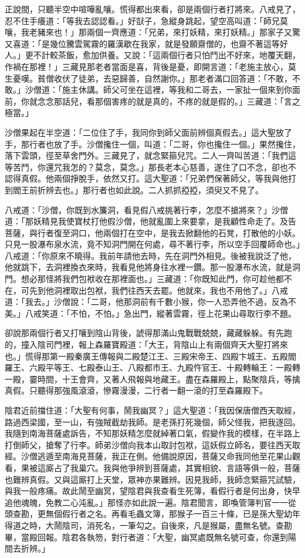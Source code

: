 正說間，只聽半空中喧嘩亂嚷。慌得都出來看，卻是兩個行者打將來。八戒見了，忍不住手癢道：「等我去認認看。」好獃子，急縱身跳起，望空高叫道：「師兄莫嚷，我老豬來也！」那兩個一齊應道：「兄弟，來打妖精，來打妖精。」那家子又驚又喜道：「是幾位騰雲駕霧的羅漢歇在我家，就是發願齋僧的，也齋不著這等好人。」更不計較茶飯，愈加供養。又說：「這兩個行者只怕鬥出不好來，地覆天翻，作禍在那裡！」三藏見那老者當面是喜，背後是憂，即開言道：「老施主放心，莫生憂嘆。貧僧收伏了徒弟，去惡歸善，自然謝你。」那老者滿口回答道：「不敢，不敢。」沙僧道：「施主休講。師父可坐在這裡，等我和二哥去，一家扯一個來到你面前，你就念念那話兒，看那個害疼的就是真的，不疼的就是假的。」三藏道：「言之極當。」

沙僧果起在半空道：「二位住了手，我同你到師父面前辨個真假去。」這大聖放了手，那行者也放了手。沙僧攙住一個，叫道：「二哥，你也攙住一個。」果然攙住，落下雲頭，徑至草舍門外。三藏見了，就念緊箍兒咒。二人一齊叫苦道：「我們這等苦鬥，你還咒我怎的？莫念，莫念。」那長老本心慈善，遂住了口不念，卻也不認得真假。他兩個掙脫手，依然又打。這大聖道：「兄弟們保著師父，等我與他打到閻王前折辨去也。」那行者也如此說。二人抓抓掗掗，須臾又不見了。

八戒道：「沙僧，你既到水簾洞，看見假八戒挑著行李，怎麼不搶將來？」沙僧道：「那妖精見我使寶杖打他假沙僧，他就亂圍上來要拿，是我顧性命走了。及告菩薩，與行者復至洞口，他兩個打在空中，是我去掀翻他的石凳，打散他的小妖。只見一股瀑布泉水流，竟不知洞門開在何處，尋不著行李，所以空手回覆師命也。」八戒道：「你原來不曉得。我前年請他去時，先在洞門外相見。後被我說泛了他，他就跳下，去洞裡換衣來時，我看見他將身往水裡一鑽。那一股瀑布水流，就是洞門。想必那怪將我們包袱收在那裡面也。」三藏道：「你既知此門，你可趁他都不在，可先到他洞裡取出包袱，我們往西天去罷。他就來，我也不用他了。」八戒道：「我去。」沙僧說：「二哥，他那洞前有千數小猴，你一人恐弄他不過，反為不美。」八戒笑道：「不怕，不怕。」急出門，縱著雲霧，徑上花果山尋取行李不題。

卻說那兩個行者又打嚷到陰山背後，諕得那滿山鬼戰戰兢兢，藏藏躲躲。有先跑的，撞入陰司門裡，報上森羅寶殿道：「大王，背陰山上有兩個齊天大聖打將來也。」慌得那第一殿秦廣王傳報與二殿楚江王、三殿宋帝王、四殿卞城王、五殿閻羅王、六殿平等王、七殿泰山王、八殿都市王、九殿忤官王、十殿轉輪王：一殿轉一殿，霎時間，十王會齊，又著人飛報與地藏王。盡在森羅殿上，點聚陰兵，等擒真假。只聽得那強風滾滾，慘霧漫漫，二行者一翻一滾的打至森羅殿下。

陰君近前擋住道：「大聖有何事，鬧我幽冥？」這大聖道：「我因保唐僧西天取經，路過西梁國，至一山，有強賊截劫我師。是老孫打死幾個，師父怪我，把我逐回。我隨到南海菩薩處訴告，不知那妖精怎麼就綽著口氣，假變作我的模樣，在半路上打倒師父，搶奪了行李。師弟沙僧向我本山取討包袱，這妖假立師名，要往西天取經。沙僧逃遁至南海見菩薩，我正在側。他備說原因，菩薩又命我同他至花果山觀看，果被這廝占了我巢穴。我與他爭辨到菩薩處，其實相貌、言語等俱一般，菩薩也難辨真假。又與這廝打上天堂，眾神亦果難辨。因見我師，我師念緊箍咒試驗，與我一般疼痛。故此鬧至幽冥，望陰君與我查看生死簿，看假行者是何出身，快早追他魂魄，免教二心沌亂。」那怪亦如此說一遍。陰君聞言，即喚管簿判官一一從頭查勘，更無個假行者之名。再看毛蟲文簿，那猴子一百三十條，已是孫大聖幼年得道之時，大鬧陰司，消死名，一筆勾之。自後來，凡是猴屬，盡無名號。查勘畢，當殿回報。陰君各執笏，對行者道：「大聖，幽冥處既無名號可查，你還到陽間去折辨。」

